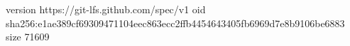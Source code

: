 version https://git-lfs.github.com/spec/v1
oid sha256:e1ae389cf69309471104eec863ecc2ffb4454643405fb6969d7e8b9106be6883
size 71609
